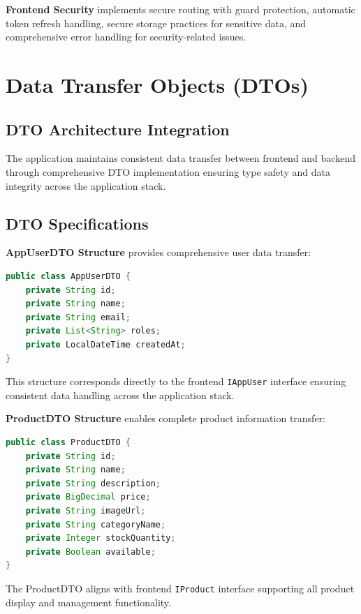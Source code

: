 \documentclass[12pt,a4paper]{article}
\begin{document}
\textbf{Frontend Security} implements secure routing with guard protection, automatic token refresh handling, secure storage practices for sensitive data, and comprehensive error handling for security-related issues.

\section{Data Transfer Objects (DTOs)}

\subsection{DTO Architecture Integration}

The application maintains consistent data transfer between frontend and backend through comprehensive DTO implementation ensuring type safety and data integrity across the application stack.

\subsection{DTO Specifications}

\textbf{AppUserDTO Structure} provides comprehensive user data transfer:

\begin{lstlisting}[language=java,caption=AppUserDTO Structure]
public class AppUserDTO {
    private String id;
    private String name;
    private String email;
    private List<String> roles;
    private LocalDateTime createdAt;
}
\end{lstlisting}

This structure corresponds directly to the frontend \texttt{IAppUser} interface ensuring consistent data handling across the application stack.

\textbf{ProductDTO Structure} enables complete product information transfer:

\begin{lstlisting}[language=java,caption=ProductDTO Structure]
public class ProductDTO {
    private String id;
    private String name;
    private String description;
    private BigDecimal price;
    private String imageUrl;
    private String categoryName;
    private Integer stockQuantity;
    private Boolean available;
}
\end{lstlisting}

The ProductDTO aligns with frontend \texttt{IProduct} interface supporting all product display and management functionality.
\end{document}
